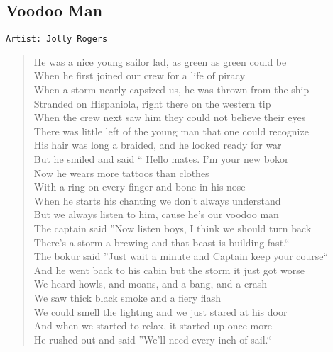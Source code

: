 \documentclass[11pt]{article}
\begin{document}
\subsection{Voodoo Man}
\label{sec:orgad0daaf}
\begin{verbatim}
Artist: Jolly Rogers
\end{verbatim}
\begin{verse}
He was a nice young sailor lad, as green as green could be\\
When he first joined our crew for a life of piracy\\
When a storm nearly capsized us, he was thrown from the ship\\
Stranded on Hispaniola, right there on the western tip\\
When the crew next saw him they could not believe their eyes\\
There was little left of the young man that one could recognize\\
His hair was long a braided, and he looked ready for war\\
But he smiled and said `` Hello mates. I'm your new bokor\\
\vspace*{1em}
Now he wears more tattoos than clothes\\
With a ring on every finger and bone in his nose\\
When he starts his chanting we don't always understand\\
But we always listen to him, cause he's our voodoo man\\
The captain said ''Now listen boys, I think we should turn back\\
There's a storm a brewing and that beast is building fast.``\\
The bokur said ''Just wait a minute and Captain keep your course``\\
And he went back to his cabin but the storm it just got worse\\
\vspace*{1em}
We heard howls, and moans, and a bang, and a crash\\
We saw thick black smoke and a fiery flash\\
We could smell the lighting and we just stared at his door\\
And when we started to relax, it started up once more\\
\vspace*{1em}
He rushed out and said ''We'll need every inch of sail.``\\

\end{verse}
\end{document}
